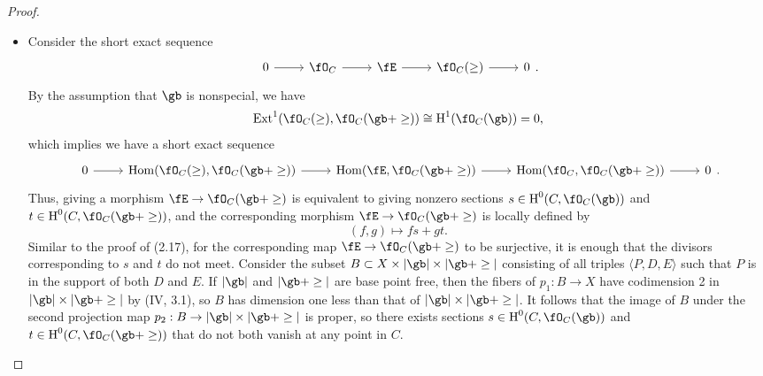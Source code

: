 \documentclass[a4paper]{article}
\begin{document}
\begin{enumerate} [label=\textbf{\arabic*.}, leftmargin=0em]
          \begin{proof} $ $ \vspace{0pt}
              \begin{itemize} [leftmargin=0cm]
                  \item[(a)]  Consider the short exact sequence
                        \[ \begin{tikzcd}
                                0 \arrow[r] & \fO_C \arrow[r] & \fE \arrow[r] & \fO_C(\ge) \arrow[r] & 0
                            \end{tikzcd} . \]
                        By the assumption that $\gb$ is nonspecial, we have
                        \begin{equation*}
                            \Ext^1(\fO_C(\ge), \fO_C(\gb + \ge)) \cong \cH^1(\fO_C(\gb)) = 0,
                        \end{equation*}
                        which implies we have a short exact sequence
                        \[ \begin{tikzcd}
                                0 \arrow[r] & \Hom(\fO_C(\ge), \fO_C(\gb + \ge)) \arrow[r] & \Hom(\fE, \fO_C(\gb + \ge)) \arrow[r] & \Hom(\fO_C, \fO_C(\gb + \ge)) \arrow[r] & 0
                            \end{tikzcd} . \]
                        Thus, giving a morphism $\fE \to \fO_C(\gb + \ge)$ is equivalent to giving nonzero sections $s \in \cH^0(C, \fO_C(\gb))$ and $t \in \cH^0(C, \fO_C(\gb + \ge))$, and the corresponding morphism $\fE \to \fO_C(\gb + \ge)$ is locally defined by
                        \begin{equation*}
                            (f, g) \mapsto fs + gt.
                        \end{equation*}
                        Similar to the proof of (2.17), for the corresponding map $\fE \to \fO_C(\gb + \ge)$ to be surjective, it is enough that the divisors corresponding to $s$ and $t$ do not meet.
                        Consider the subset $B \subset X \times |\gb| \times |\gb + \ge|$ consisting of all triples $\langle P, D, E \rangle$ such that $P$ is in the support of both $D$ and $E$.
                        If $|\gb|$ and $|\gb + \ge|$ are base point free, then the fibers of $p_1 : B \to X$ have codimension 2 in $|\gb| \times |\gb + \ge|$ by (IV, 3.1), so $B$ has dimension one less than that of $|\gb| \times |\gb + \ge|$.
                        It follows that the image of $B$ under the second projection map $p_2 : B \to |\gb| \times |\gb + \ge|$ is proper, so there exists sections $s \in \cH^0(C, \fO_C(\gb))$ and $t \in \cH^0(C, \fO_C(\gb + \ge))$ that do not both vanish at any point in $C$.

\end{itemize}
\end{proof}
\end{enumerate}
\end{document}
